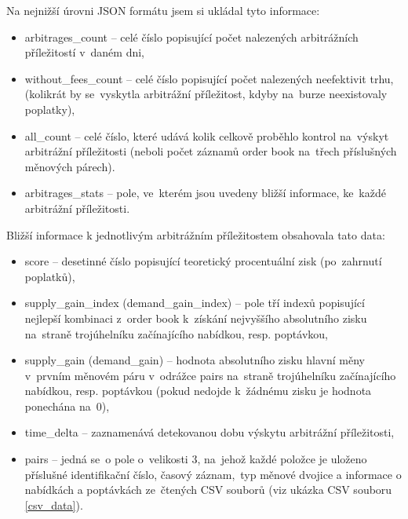 \documentclass[thesis=B,czech]{FITthesis}[2019/03/21]
\begin{document}
Na nejnižší úrovni JSON formátu jsem si ukládal tyto informace:
\begin{itemize}
    \item arbitrages\_count -- celé číslo popisující počet nalezených arbitrážních příležitostí v~daném dni,
    \item without\_fees\_count -- celé číslo popisující počet nalezených neefektivit trhu, (kolikrát by se~vyskytla arbitrážní příležitost, kdyby na~burze neexistovaly poplatky), 
    \item all\_count -- celé číslo, které udává kolik celkově proběhlo kontrol na~výskyt arbitrážní příležitosti (neboli počet záznamů order book na~třech \linebreak příslušných měnových párech).
    \item arbitrages\_stats -- pole, ve~kterém jsou uvedeny bližší informace, ke~každé arbitrážní příležitosti. 
\end{itemize}
Bližší informace k jednotlivým arbitrážním příležitostem obsahovala tato data:
\begin{itemize}
    \item score -- desetinné číslo popisující teoretický procentuální zisk (po~zahrnutí poplatků),
    \item supply\_gain\_index (demand\_gain\_index) -- pole tří indexů popisující nejlepší kombinaci z~order book k~získání nejvyššího absolutního zisku na~straně trojúhelníku začínajícího nabídkou, resp. poptávkou,
    \item supply\_gain (demand\_gain) -- hodnota absolutního zisku hlavní měny v~prvním měnovém páru v~odrážce pairs na~straně trojúhelníku začínajícího nabídkou, resp. poptávkou (pokud nedojde k~žádnému zisku je hodnota ponechána na~0),
    \item time\_delta -- zaznamenává detekovanou dobu výskytu arbitrážní \linebreak příležitosti, 
    \item pairs -- jedná se~o pole o~velikosti 3, na~jehož každé položce je uloženo příslušné identifikační číslo, časový záznam,~typ měnové dvojice a informace o nabídkách a poptávkách ze~čtených CSV souborů (viz ukázka CSV souboru \ref{csv_data}).
\end{itemize}
\end{document}

